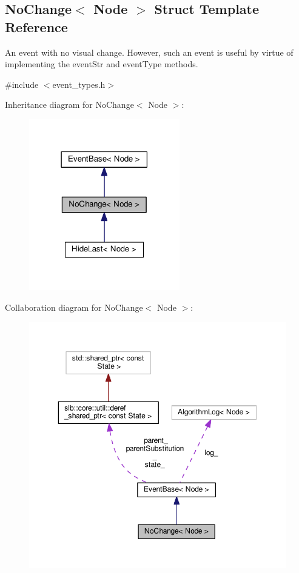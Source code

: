 \hypertarget{structNoChange}{}\subsection{No\+Change$<$ Node $>$ Struct Template Reference}
\label{structNoChange}


An event with no visual change. However, such an event is useful by virtue of implementing the {\ttfamily event\+Str} and {\ttfamily event\+Type} methods.  




{\ttfamily \#include $<$event\+\_\+types.\+h$>$}



Inheritance diagram for No\+Change$<$ Node $>$\+:\nopagebreak
\begin{figure}[H]
\begin{center}
\leavevmode
\includegraphics[width=186pt]{structNoChange__inherit__graph}
\end{center}
\end{figure}


Collaboration diagram for No\+Change$<$ Node $>$\+:\nopagebreak
\begin{figure}[H]
\begin{center}
\leavevmode
\includegraphics[width=350pt]{structNoChange__coll__graph}
\end{center}
\end{figure}
